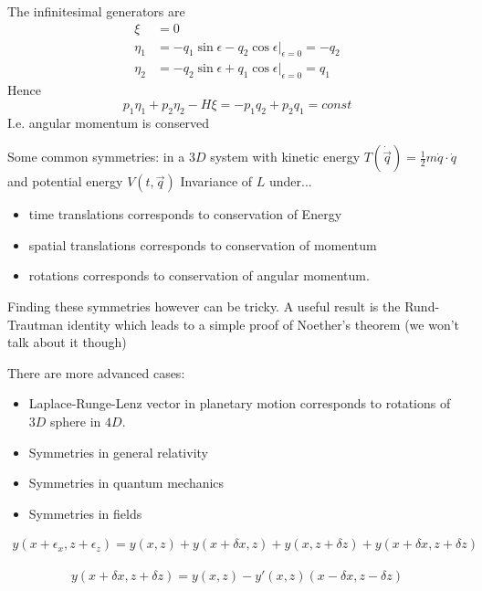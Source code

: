 \documentclass{E:/Documents/Latex/myassignment}
\begin{document}
The infinitesimal generators are
\begin{align*}
	\xi &= 0\\
	\eta_1 &= - q_1 \sin \epsilon - q_2 \cos \epsilon |_{\epsilon = 0} = - q_2\\
	\eta_2 &= - q_2 \sin \epsilon + q_1 \cos \epsilon |_{\epsilon = 0} = q_1
\end{align*}
Hence
\[p_1 \eta_1 + p_2 \eta_2 - H \xi = -p_1 q_2 + p_2 q_1 = const\]
I.e. angular momentum is conserved



Some common symmetries:
in a $3D$ system with kinetic energy $T(\dot{\vec q}) = \frac12 m \dot q\cdot \dot q$ and potential energy $V(t,\vec q)$
Invariance of $L$ under...
\begin{itemize}
	\item time translations corresponds to conservation of Energy
	\item spatial translations corresponds to conservation of momentum
	\item rotations corresponds to conservation of angular momentum.
\end{itemize}

Finding these symmetries however can be tricky.
A useful result is the Rund-Trautman identity which leads to a simple proof of Noether's theorem (we won't talk about it though)


There are more advanced cases:
\begin{itemize}
	\item Laplace-Runge-Lenz vector in planetary motion corresponds to rotations of $3D$ sphere in $4D$.
	\item Symmetries in general relativity
	\item Symmetries in quantum mechanics
	\item Symmetries in fields
\end{itemize}






\begin{align*}
	y(x + \epsilon_x, z + \epsilon_z) = y(x,z) + y(x+\delta x,z) + y(x,z + \delta z) + y(x + \delta x, z + \delta z)
\end{align*}


\begin{align*}
	y(x+ \delta x, z + \delta z) = y(x,z) - y'(x,z)(x - \delta x, z - \delta z)
\end{align*}
\end{document}
